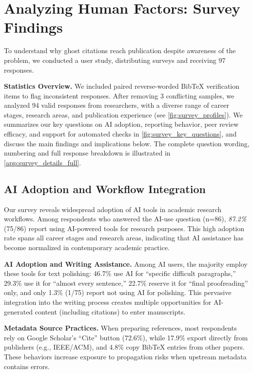 \section{Analyzing Human Factors: Survey Findings}
\label{sec:survey_results}

To understand why ghost citations reach publication despite awareness of the problem, we conducted a user study, distributing surveys and receiving 97 responses.



\noindent
\textbf{Statistics Overview.}
We included paired reverse-worded BibTeX verification items to flag inconsistent responses.  
After removing 3 conflicting samples, we analyzed 94 valid responses from researchers, with a diverse range of career stages, research areas, and publication experience (see \cref{fig:survey_profiles}).
We summarizes our key questions on AI adoption, reporting behavior, peer review efficacy, and support for automated checks in \cref{fig:survey_key_questions}, and discuss the main findings and implications below. 
The complete question wording, numbering and full response breakdown is illustrated in \cref{app:survey_details_full}.

\subsection{AI Adoption and Workflow Integration}

Our survey reveals widespread adoption of AI tools in academic research workflows.
Among respondents who answered the AI-use question (n=86), \textit{87.2\%} (75/86) report using AI-powered tools for research purposes.
This high adoption rate spans all career stages and research areas, indicating that AI assistance has become normalized in contemporary academic practice.

\noindent
\textbf{AI Adoption and Writing Assistance.}
Among AI users, the majority employ these tools for text polishing:
46.7\% use AI for ``specific difficult paragraphs,''
29.3\% use it for ``almost every sentence,'' 22.7\% reserve it for ``final proofreading'' only,
and only 1.3\% (1/75) report not using AI for polishing.
This pervasive integration into the writing process creates multiple opportunities for AI-generated content (including citations) to enter manuscripts.

\noindent
\textbf{Metadata Source Practices.}
When preparing references, most respondents rely on Google Scholar's ``Cite'' button (72.6\%), while 17.9\% export directly from publishers (e.g., IEEE/ACM), and 4.8\% copy BibTeX entries from other papers.
These behaviors increase exposure to propagation risks when upstream metadata contains errors.

